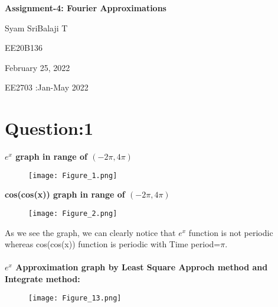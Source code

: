 \documentclass[12pt]{article}
\newcommand\titleofdoc{\textbf{Assignment-4: Fourier Approximations}}
\begin{document}
\begin{titlepage}
   \begin{center}
        \vspace*{4cm} %

        \Huge{\titleofdoc} 

        \vspace{3 cm}
        \Large{Syam SriBalaji T}
       
        \vspace{0.25cm}
        \large{EE20B136}
       
        \vspace{3 cm}
        \Large{February 25, 2022}
        
        \vspace{0.25 cm}
        \Large{EE2703 :Jan-May 2022}
       

       \vfill
    \end{center}
\end{titlepage}

\setcounter{page}{2}
\pagestyle{fancy}
\fancyhf{}
\rhead{\thepage}

\section*{Question:1}

\textbf{$e^x$ graph in range of $(-2\pi,4\pi)$}\\

\begin{figure}[h!]
\centering
\texttt{[image: Figure\_1.png]}
\end{figure}

\textbf{cos(cos(x)) graph in range of $(-2\pi,4\pi)$}\\

\begin{figure}[h!]
\centering
\texttt{[image: Figure\_2.png]}
\end{figure}

\newpage
As we see the graph, we can clearly notice that $e^x$ function is not periodic whereas cos(cos(x)) function is periodic with Time period=$\pi$.\\\\
\textbf{$e^x$ Approximation graph by Least Square Approch method and Integrate method:}
\begin{figure}[h!]
\centering
\texttt{[image: Figure\_13.png]}
\end{figure}
\end{document}
